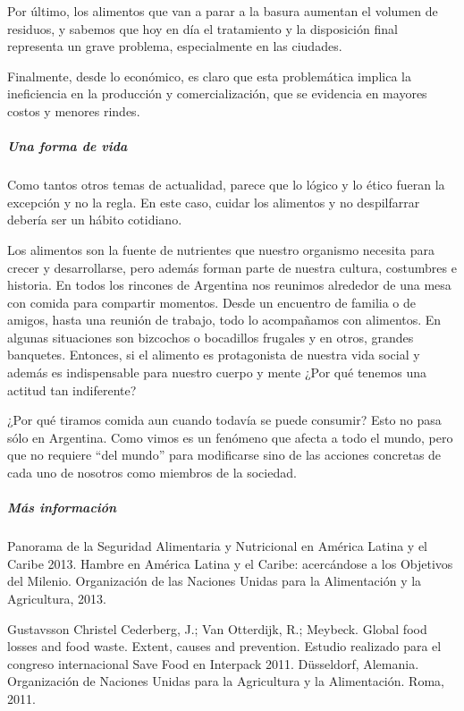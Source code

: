 \documentclass[
]{article}
\begin{document}
Por último, los alimentos que van a parar a la basura aumentan el
volumen de residuos, y sabemos que hoy en día el tratamiento y la
disposición final representa un grave problema, especialmente en las
ciudades.

Finalmente, desde lo económico, es claro que esta problemática implica
la ineficiencia en la producción y comercialización, que se evidencia en
mayores costos y menores rindes.

\hypertarget{una-forma-de-vida}{%
\subparagraph{Una forma de vida}\label{una-forma-de-vida}}

Como tantos otros temas de actualidad, parece que lo lógico y lo ético
fueran la excepción y no la regla. En este caso, cuidar los alimentos y
no despilfarrar debería ser un hábito cotidiano.

Los alimentos son la fuente de nutrientes que nuestro organismo necesita
para crecer y desarrollarse, pero además forman parte de nuestra
cultura, costumbres e historia. En todos los rincones de Argentina nos
reunimos alrededor de una mesa con comida para compartir momentos. Desde
un encuentro de familia o de amigos, hasta una reunión de trabajo, todo
lo acompañamos con alimentos. En algunas situaciones son bizcochos o
bocadillos frugales y en otros, grandes banquetes. Entonces, si el
alimento es protagonista de nuestra vida social y además es
indispensable para nuestro cuerpo y mente ¿Por qué tenemos una actitud
tan indiferente?

¿Por qué tiramos comida aun cuando todavía se puede consumir? Esto no
pasa sólo en Argentina. Como vimos es un fenómeno que afecta a todo el
mundo, pero que no requiere ``del mundo'' para modificarse sino de las
acciones concretas de cada uno de nosotros como miembros de la sociedad.

\hypertarget{muxe1s-informaciuxf3n}{%
\subparagraph{Más información}\label{muxe1s-informaciuxf3n}}

Panorama de la Seguridad Alimentaria y Nutricional en América Latina y
el Caribe 2013. Hambre en América Latina y el Caribe: acercándose a los
Objetivos del Milenio. Organización de las Naciones Unidas para la
Alimentación y la Agricultura, 2013.

Gustavsson Christel Cederberg, J.; Van Otterdijk, R.; Meybeck. Global
food losses and food waste. Extent, causes and prevention. Estudio
realizado para el congreso internacional Save Food en Interpack 2011.
Düsseldorf, Alemania. Organización de Naciones Unidas para la
Agricultura y la Alimentación. Roma, 2011.
\end{document}
